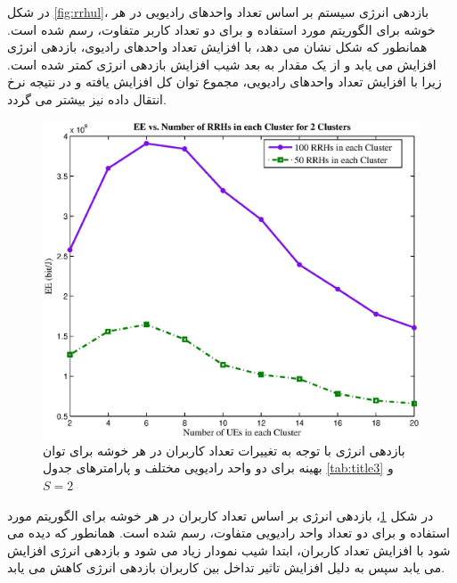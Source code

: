  در شکل \ref{fig:rrhul}، بازدهی انرژی سیستم  بر اساس تعداد واحدهای رادیویی در هر خوشه برای الگوریتم مورد استفاده و برای دو تعداد کاربر متفاوت، رسم شده است. 
 همانطور که  شکل  نشان می دهد، با افزایش تعداد واحدهای رادیوی، بازدهی انرژی افزایش می یابد و از یک مقدار به بعد شیب افزایش بازدهی انرژی کمتر شده است. زیرا با افزایش تعداد واحدهای رادیویی، مجموع توان کل افزایش یافته و در نتیجه نرخ انتقال داده نیز بیشتر می گردد.

 \begin{figure}[H]
  \centering
    \includegraphics[width=\linewidth]{./fig3/ueul}
  \caption{  بازدهی انرژی با توجه به تغییرات تعداد کاربران در هر خوشه برای توان بهینه برای 
   دو واحد رادیویی مختلف
   و پارامترهای جدول \ref{tab:title3} و $S=2$}
  \label{fig:ueul}
\end{figure}


در شکل \ref{fig:ueul}، بازدهی انرژی بر اساس تعداد کاربران در هر خوشه برای الگوریتم مورد استفاده و برای دو تعداد واحد رادیویی متفاوت، رسم شده است. همانطور که  دیده می شود با افزایش تعداد کاربران، ابتدا شیب نمودار زیاد می شود و بازدهی انرژی افزایش می یابد سپس به دلیل افزایش تاثیر تداخل بین کاربران بازدهی انرژی کاهش می یابد. 

